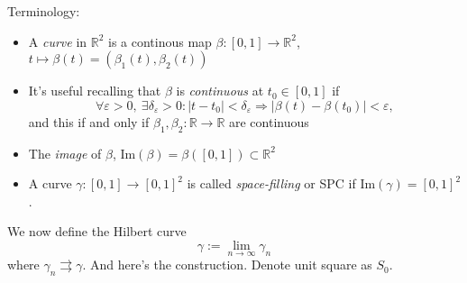 \documentclass[a4paper]{article}
\theoremstyle{definition}
\begin{document}
Terminology:
\begin{itemize}
    \item A \textit{curve} in $\mathbb R^2$ is a continous map $\beta:[0,1]\rightarrow \mathbb R^2$, $t\mapsto \beta(t)=(\beta_1(t),\beta_2(t))$
    \item It's useful recalling that $\beta$ is \textit{continuous} at $t_0\in [0,1]$ if
    \[
    \forall \varepsilon >0, \ \exists \delta_\varepsilon>0: |t-t_0|<\delta_\varepsilon \Rightarrow |\beta(t)-\beta(t_0)|<\varepsilon ,
    \]
    and this if and only if $\beta_1,\beta_2:\mathbb R\rightarrow \mathbb R$ are continuous
    \item The \textit{image} of $\beta$, $\text{Im} (\beta)=\beta([0,1])\subset \mathbb R^2$
    \item A curve $\gamma:[0,1]\rightarrow[0,1]^2$ is called \textit{space-filling} or SPC if $\text{Im}(\gamma)=[0,1]^2$.
\end{itemize}
We now define the Hilbert curve
\[
\gamma := \lim_{n\rightarrow \infty} \gamma_n
\]
where $\gamma_n \rightrightarrows \gamma$. And here's the construction. Denote unit square as $S_0$.
\end{document}
